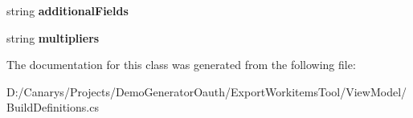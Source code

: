 \begin{DoxyCompactItemize}
\mbox{\label{class_templates_generator_tool_1_1_view_model_1_1_build_definitions_1_1_inputs1_ac0ee63877f2a1c44190295679d99bc19}} 
string {\bfseries additional\+Fields}
\item 
\mbox{\label{class_templates_generator_tool_1_1_view_model_1_1_build_definitions_1_1_inputs1_a1deebb4082ac7b6dfc1fe4128d295cb8}} 
string {\bfseries multipliers}
\end{DoxyCompactItemize}


The documentation for this class was generated from the following file\+:\begin{DoxyCompactItemize}
\item 
D\+:/\+Canarys/\+Projects/\+Demo\+Generator\+Oauth/\+Export\+Workitems\+Tool/\+View\+Model/Build\+Definitions.\+cs\end{DoxyCompactItemize}
